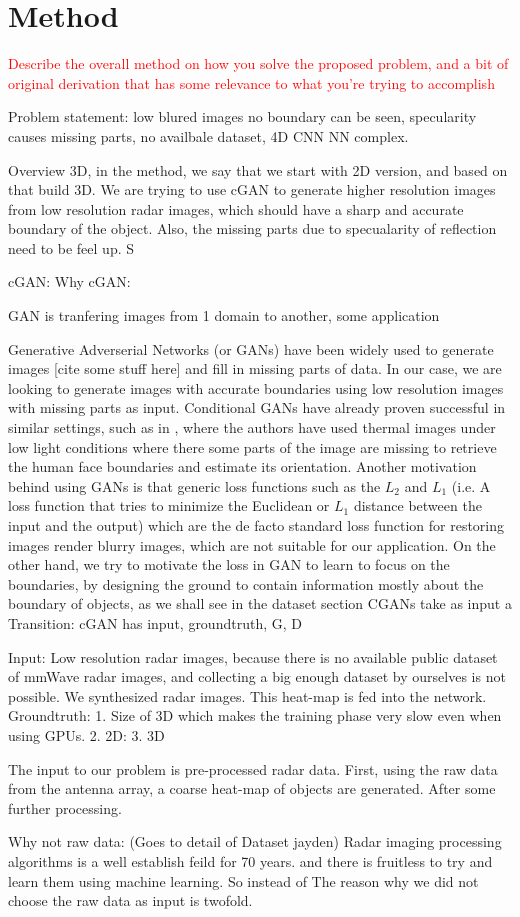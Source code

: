 \section{ Method}
\textcolor{red}{
Describe the overall method on how you solve the proposed problem, and a bit of original derivation that has some relevance to what you’re trying to accomplish
}

Problem statement: low blured images no boundary can be seen, specularity causes missing parts, no availbale dataset, 4D CNN NN complex.

Overview 3D, in the method, we say that we start with 2D version, and based on that build 3D. 
We are trying to use cGAN to generate higher resolution images from low resolution radar images, which should have a sharp and accurate boundary of the object. Also, the missing parts due to specualarity of reflection need to be feel up.  S

cGAN:
	Why cGAN:
	
	GAN is tranfering images from 1 domain to another, some application 
	
	Generative Adverserial Networks (or GANs) have been widely used to generate images [cite some stuff here] and fill in missing parts of data. In our case, we are looking to generate images with accurate boundaries using low resolution images with missing parts as input. Conditional GANs have already proven successful in similar settings, such as in \cite{hams}, where the authors have used thermal images under low light conditions where there some parts of the image are missing to retrieve the human face boundaries and estimate its orientation. Another motivation behind using GANs is that generic loss functions such as the $L_2$ and $L_1$ (i.e. A loss function that tries to minimize the Euclidean or $L_1$ distance between the input and the output) which are the de facto standard loss function for restoring images render blurry images, which are not suitable for our application. On the other hand, we try to motivate the loss in GAN to learn to focus on the boundaries, by designing the ground to contain information mostly about the boundary of objects, as we shall see in the dataset section
	CGANs take as input a 
	Transition: cGAN has input, groundtruth, G, D
	
	Input: Low resolution radar images, because there is no available public dataset of mmWave radar images, and collecting a big enough dataset by ourselves is not possible. We synthesized radar images. This heat-map is fed into the network. 
	Groundtruth: 
	1. Size of 3D 	which makes the training phase very slow even when using GPUs. 
	2. 2D:
	3. 3D


The input to our problem is pre-processed radar data. First, using the raw data from the antenna array, a coarse heat-map of objects are generated. After some further processing. 

Why not raw data: (Goes to detail of Dataset jayden)
Radar imaging processing algorithms is a well establish feild for 70 years. and there is fruitless to try and learn them using machine learning.
So instead of  The reason why we did not choose the raw data as input is twofold. 